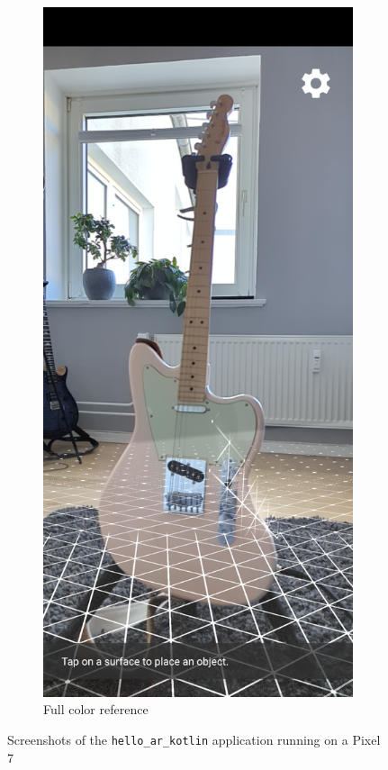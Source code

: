 \begin{figure}[ht!]
\begin{subfigure}[t]{.45\textwidth}
        \includegraphics[width=.8\textwidth]{images/depth_api_hello_world_img}
        \caption{Full color reference}
    \end{subfigure}
    \caption{Screenshots of the \texttt{hello\_ar\_kotlin} application running on a Pixel 7}
    \label{fig:hello_world_screenshot}
\end{figure}
